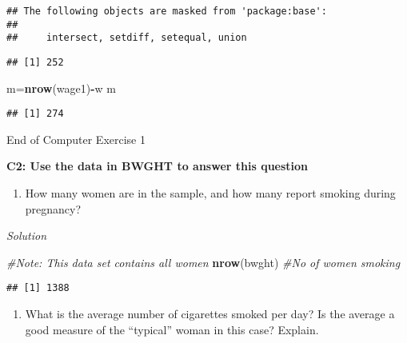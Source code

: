 \documentclass[
]{article}
\newenvironment{Shaded}{\begin{snugshade}}{\end{snugshade}}
\newcommand{\CommentTok}[1]{\textcolor[rgb]{0.56,0.35,0.01}{\textit{#1}}}
\newcommand{\KeywordTok}[1]{\textcolor[rgb]{0.13,0.29,0.53}{\textbf{#1}}}
\newcommand{\NormalTok}[1]{#1}
\newcommand{\OperatorTok}[1]{\textcolor[rgb]{0.81,0.36,0.00}{\textbf{#1}}}
\newcommand{\StringTok}[1]{\textcolor[rgb]{0.31,0.60,0.02}{#1}}
\providecommand{\tightlist}{%
  \setlength{\itemsep}{0pt}\setlength{\parskip}{0pt}}
\begin{document}
\begin{verbatim}
## The following objects are masked from 'package:base':
## 
##     intersect, setdiff, setequal, union
\end{verbatim}

\begin{Shaded}
\end{Shaded}

\begin{verbatim}
## [1] 252
\end{verbatim}

\begin{Shaded}
\begin{Highlighting}[]
\NormalTok{m=}\KeywordTok{nrow}\NormalTok{(wage1)}\OperatorTok{-}\NormalTok{w}
\NormalTok{m}
\end{Highlighting}
\end{Shaded}

\begin{verbatim}
## [1] 274
\end{verbatim}

End of Computer Exercise 1

\textbf{C2: Use the data in BWGHT to answer this question}

\begin{enumerate}
\def\labelenumi{(\roman{enumi})}
\tightlist
\item
  How many women are in the sample, and how many report smoking during
  pregnancy?
\end{enumerate}

\emph{Solution}

\begin{Shaded}
\begin{Highlighting}[]
\CommentTok{#Note: This data set contains all women}
\KeywordTok{nrow}\NormalTok{(bwght) }\CommentTok{#No of women smoking}
\end{Highlighting}
\end{Shaded}

\begin{verbatim}
## [1] 1388
\end{verbatim}

\begin{enumerate}
\def\labelenumi{(\roman{enumi})}
\setcounter{enumi}{1}
\tightlist
\item
  What is the average number of cigarettes smoked per day? Is the
  average a good measure of the ``typical'' woman in this case? Explain.
\end{enumerate}
\end{document}
